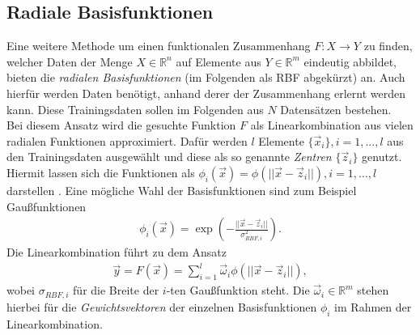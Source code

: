 \subsection{Radiale Basisfunktionen}
Eine weitere Methode um einen funktionalen Zusammenhang $F : X \rightarrow Y$ zu finden, welcher Daten der Menge $X \in \mathbb{R}^n$ auf Elemente aus $Y \in \mathbb{R}^m$ eindeutig abbildet, bieten die \textit{radialen Basisfunktionen} (im Folgenden als \textsc{RBF} abgekürzt) an. Auch hierfür werden Daten benötigt, anhand derer der Zusammenhang erlernt werden kann. Diese Trainingsdaten sollen im Folgenden aus $N$ Datensätzen bestehen.\\

Bei diesem Ansatz wird die gesuchte Funktion $F$ als Linearkombination aus vielen radialen Funktionen approximiert. Dafür werden $l$ Elemente $\{\vec{x}_i\}, i=1,...,l$ aus den Trainingsdaten ausgewählt und diese als so genannte \textit{Zentren} $\{\vec{z}_i\}$ genutzt. Hiermit lassen sich die Funktionen als $\phi_i(\vec{x}) = \phi(||\vec{x}-\vec{z}_i||), i=1,\ldots ,l$ darstellen \citep{lowe2multi}. Eine mögliche Wahl der Basisfunktionen sind zum Beispiel Gaußfunktionen
\begin{align*}
\phi_i(\vec{x}) = \exp \left( - \frac{||\vec{x}-\vec{z}_i||}{\sigma_{RBF, i}^2} \right).
\end{align*}
Die Linearkombination führt zu dem Ansatz 
\begin{align}
\label{eq:rbf_lincomb}
\vec{y} = F(\vec{x}) = \sum^l_{i=1} \vec{\omega}_i \phi(||\vec{x} - \vec{z}_i||),
\end{align}
wobei $\sigma_{RBF, i}$ für die Breite der $i$-ten Gaußfunktion steht.
Die $\vec{\omega}_i \in \mathbb{R}^m$ stehen hierbei für die \textit{Gewichtsvektoren} der einzelnen Basisfunktionen $\phi_i$ im Rahmen der Linearkombination.\\

